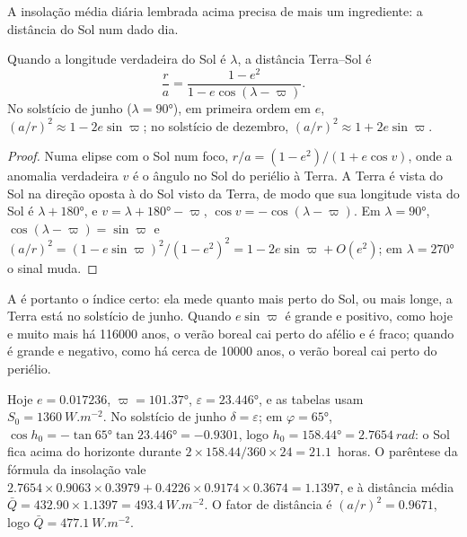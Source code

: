 A insolação média diária lembrada acima precisa de mais um ingrediente: a distância do Sol num
dado dia.

\begin{proposition}\label{prop:b2:orbital-forcing:distance}
Quando a longitude verdadeira do Sol é $\lambda$, a distância Terra--Sol é
\[
  \frac{r}{a} = \frac{1 - e^2}{1 - e\cos(\lambda - \varpi)} .
\]
No solstício de junho ($\lambda = \ang{90}$), em primeira ordem em $e$,
$(a/r)^2 \approx 1 - 2e\sin\varpi$; no solstício de dezembro, $(a/r)^2 \approx 1 + 2e\sin\varpi$.
\end{proposition}

\begin{proof}
Numa elipse com o Sol num foco, $r/a = (1 - e^2)/(1 + e\cos v)$, onde a anomalia verdadeira $v$
é o ângulo no Sol do periélio à Terra. A Terra é vista do Sol na
direção oposta à do Sol visto da Terra, de modo que sua longitude vista do Sol é
$\lambda + \ang{180}$, e $v = \lambda + \ang{180} - \varpi$, $\cos v = -\cos(\lambda - \varpi)$.
Em $\lambda = \ang{90}$, $\cos(\lambda - \varpi) = \sin\varpi$ e $(a/r)^2 = (1 -
e\sin\varpi)^2/(1 - e^2)^2 = 1 - 2e\sin\varpi + O(e^2)$; em $\lambda = \ang{270}$ o sinal muda.
\end{proof}

A  é portanto o índice certo: ela mede quanto mais perto do Sol, ou mais
longe, a Terra está no solstício de junho. Quando $e\sin\varpi$ é grande e positivo, como hoje e
muito mais há \num{116000} anos, o verão boreal cai perto do afélio e é fraco; quando é
grande e negativo, como há cerca de \num{10000} anos, o verão boreal cai perto do periélio.

\begin{example}\label{ex:b2:orbital-forcing:today}
Hoje $e = 0.017236$, $\varpi = \ang{101.37}$, $\varepsilon = \ang{23.446}$, e as tabelas usam
$S_0 = \qty{1360}{W.m^{-2}}$. No solstício de junho $\delta = \varepsilon$; em $\varphi =
\ang{65}$, $\cos h_0 = -\tan\ang{65}\tan\ang{23.446} = -0.9301$, logo $h_0 = \ang{158.44} =
\qty{2.7654}{rad}$: o Sol fica acima do horizonte durante $2 \times 158.44/360 \times 24 = 21.1$~horas. O parêntese
da fórmula da insolação vale $2.7654 \times 0.9063 \times 0.3979 + 0.4226 \times 0.9174 \times 0.3674 =
1.1397$, e à distância média $\bar Q = 432.90 \times 1.1397 = \qty{493.4}{W.m^{-2}}$. O
fator de distância é $(a/r)^2 = 0.9671$, logo $\bar Q = \qty{477.1}{W.m^{-2}}$.
\end{example}

